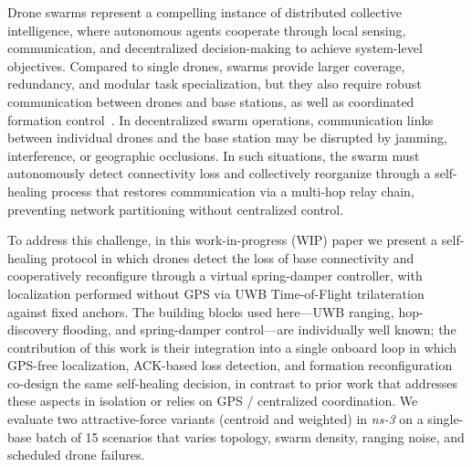 \documentclass[conference]{IEEEtran}
\begin{document}
Drone swarms represent a compelling instance of distributed collective intelligence, 
where autonomous agents cooperate through local sensing, communication, and 
decentralized decision-making to achieve system-level objectives. Compared to single 
drones, swarms provide larger coverage, redundancy, and modular task specialization, 
but they also require robust communication between drones and base stations, as well 
as coordinated formation control~\cite{ouyang2023formation}. In decentralized swarm 
operations, communication links between individual drones and the base station may be 
disrupted by jamming, interference, or geographic occlusions. In such situations, 
the swarm must autonomously detect connectivity loss and collectively reorganize 
through a self-healing process that restores communication via a multi-hop relay chain, 
preventing network partitioning without centralized control.


To address this challenge, in this work-in-progress (WIP) paper we present a self-healing 
protocol in which drones detect the loss of base connectivity and cooperatively 
reconfigure through a virtual spring-damper controller, with localization performed 
without GPS via UWB Time-of-Flight trilateration against fixed anchors. The building 
blocks used here---UWB ranging, hop-discovery flooding, and spring-damper control---are 
individually well known; the contribution of this work is their integration into a single 
onboard loop in which GPS-free localization, ACK-based loss detection, and formation 
reconfiguration co-design the same self-healing decision, in contrast to prior work that 
addresses these aspects in isolation or relies on GPS / centralized coordination. We 
evaluate two attractive-force variants (centroid and weighted) in \textit{ns-3} on a 
single-base batch of 15 scenarios that varies topology, swarm density, ranging noise, 
and scheduled drone failures.
\end{document}
